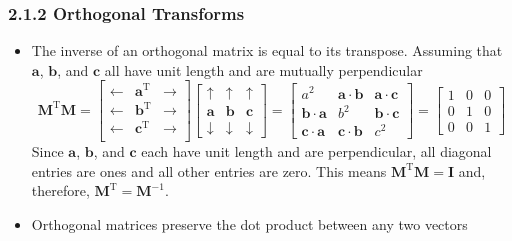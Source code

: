 \documentclass[11pt]{article}
\newcommand{\bm}[1]{\mathbf{#1}}
\begin{document}
\subsubsection*{2.1.2 Orthogonal Transforms}
    \begin{itemize}
        \item The inverse of an orthogonal matrix is equal to its transpose.
            Assuming that $\bm{a}$, $\bm{b}$, and $\bm{c}$ all have unit
            length and are mutually perpendicular
            \begin{equation}
                \bm{M}^\text{T}\bm{M} =
                \begin{bmatrix}
                    \leftarrow & \bm{a}^\text{T} & \rightarrow \\
                    \leftarrow & \bm{b}^\text{T} & \rightarrow \\
                    \leftarrow & \bm{c}^\text{T} & \rightarrow \\
                \end{bmatrix}
                \begin{bmatrix}
                    \uparrow & \uparrow & \uparrow \\
                    \bm{a} & \bm{b} & \bm{c} \\
                    \downarrow & \downarrow & \downarrow
                \end{bmatrix} =
                \begin{bmatrix}
                    a^2 & \bm{a} \cdot \bm{b} & \bm{a} \cdot \bm{c} \\
                    \bm{b} \cdot \bm{a} & b^2 & \bm{b} \cdot \bm{c} \\
                    \bm{c} \cdot \bm{a} & \bm{c} \cdot \bm{b} & c^2
                \end{bmatrix}=
                \begin{bmatrix}
                    1 & 0 & 0 \\
                    0 & 1 & 0 \\
                    0 & 0 & 1
                \end{bmatrix}
            \end{equation}
            Since $\bm{a}$, $\bm{b}$, and $\bm{c}$ each have unit length
            and are perpendicular, all diagonal entries are ones and
            all other entries are zero.  This means $\bm{M}^\text{T}\bm{M} = \bm{I}$
            and, therefore, $\bm{M}^\text{T} = \bm{M}^{-1}$.
        \item Orthogonal matrices preserve the dot product between any two vectors

\end{itemize}
\end{document}
